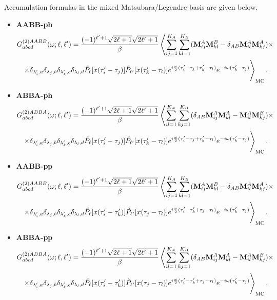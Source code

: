 \documentclass[a4paper,12pt]{article}
\renewcommand{\t}{\ensuremath{\tau}}
\newcommand{\w}{\ensuremath{\omega}}
\begin{document}
Accumulation formulas in the mixed Matsubara/Legendre basis are given below.
\begin{itemize}
	\item \textbf{AABB-ph}
	\begin{multline}
		G^{(2)AABB}_{abcd}(\w;\ell,\ell') =
		\frac{(-1)^{\ell'+1}\sqrt{2\ell+1}\sqrt{2\ell'+1}}{\beta}\left\langle
		\sum_{ij=1}^{K_A}\sum_{kl=1}^{K_B}
		(\mathbf{M}^A_{ij} \mathbf{M}^B_{kl} - \delta_{AB}\mathbf{M}^A_{il} \mathbf{M}^A_{kj})
		\times\right.\\\left.\times
		\delta_{\lambda'_i,a} \delta_{\lambda_j,b}\delta_{\lambda'_k,c} \delta_{\lambda_l,d}
		\tilde P_\ell[x(\t'_i-\t_j)] \tilde P_{\ell'}[x(\t'_k-\t_l)]
		e^{i\frac{\w}{2}(\t'_i-\t_j+\t'_k-\t_l)} e^{-i\w(\t'_k-\t_j)}
		\vphantom{\sum_{ijkl=1}^K} \right\rangle_\mathrm{MC}.
	\end{multline}
	\item \textbf{ABBA-ph}
	\begin{multline}
		G^{(2)ABBA}_{abcd}(\w;\ell,\ell') =
		\frac{(-1)^{\ell'+1}\sqrt{2\ell+1}\sqrt{2\ell'+1}}{\beta}\left\langle
		\sum_{il=1}^{K_A}\sum_{kj=1}^{K_B}
		(\delta_{AB}\mathbf{M}^A_{ij} \mathbf{M}^A_{kl} - \mathbf{M}^A_{il} \mathbf{M}^B_{kj})
		\times\right.\\\left.\times
		\delta_{\lambda'_i,a} \delta_{\lambda_j,b}\delta_{\lambda'_k,c} \delta_{\lambda_l,d}
		\tilde P_\ell[x(\t'_i-\t_j)] \tilde P_{\ell'}[x(\t'_k-\t_l)]
		e^{i\frac{\w}{2}(\t'_i-\t_j+\t'_k-\t_l)} e^{-i\w(\t'_k-\t_j)}
		\vphantom{\sum_{ijkl=1}^K} \right\rangle_\mathrm{MC}.
	\end{multline}
	\item \textbf{AABB-pp}
	\begin{multline}
		G^{(2)AABB}_{abcd}(\w;\ell,\ell') =
		\frac{(-1)^{\ell'+1}\sqrt{2\ell+1}\sqrt{2\ell'+1}}{\beta}\left\langle
		\sum_{ij=1}^{K_A}\sum_{kl=1}^{K_B}
		(\mathbf{M}^A_{ij} \mathbf{M}^B_{kl} - \delta_{AB}\mathbf{M}^A_{il} \mathbf{M}^A_{kj})
		\times\right.\\\left.\times
		\delta_{\lambda'_i,a} \delta_{\lambda_j,b}\delta_{\lambda'_k,c} \delta_{\lambda_l,d}
		\tilde P_\ell[x(\t'_i-\t'_k)] \tilde P_{\ell'}[x(\t_j-\t_l)]
		e^{i\frac{\w}{2}(\t'_i-\t'_k+\t_j-\t_l)} e^{-i\w(\t'_k-\t_j)}
		\vphantom{\sum_{ijkl=1}^K} \right\rangle_\mathrm{MC}.
	\end{multline}
	\item \textbf{ABBA-pp}
	\begin{multline}
		G^{(2)ABBA}_{abcd}(\w;\ell,\ell') =
		\frac{(-1)^{\ell'+1}\sqrt{2\ell+1}\sqrt{2\ell'+1}}{\beta}\left\langle
		\sum_{il=1}^{K_A}\sum_{kj=1}^{K_B}
		(\delta_{AB}\mathbf{M}^A_{ij} \mathbf{M}^A_{kl} - \mathbf{M}^A_{il} \mathbf{M}^B_{kj})
		\times\right.\\\left.\times
		\delta_{\lambda'_i,a} \delta_{\lambda_j,b}\delta_{\lambda'_k,c} \delta_{\lambda_l,d}
		\tilde P_\ell[x(\t'_i-\t'_k)] \tilde P_{\ell'}[x(\t_j-\t_l)]
		e^{i\frac{\w}{2}(\t'_i-\t'_k+\t_j-\t_l)} e^{-i\w(\t'_k-\t_j)}
		\vphantom{\sum_{ijkl=1}^K} \right\rangle_\mathrm{MC}.
	\end{multline}
\end{itemize}
\end{document}
